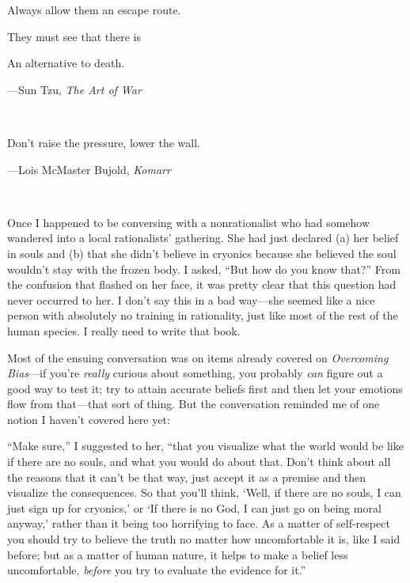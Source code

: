 {
 Always allow them an escape route.}

{
 They must see that there is}

{
 An alternative to death.}

{\raggedleft
 {}---Sun Tzu, \textit{The Art of War}
\par}


\bigskip

{
 ~}

{
 Don't raise the pressure, lower the wall.}

{\raggedleft
 {}---Lois McMaster Bujold, \textit{Komarr}
\par}


\bigskip

{
 ~}

{
 Once I happened to be conversing with a nonrationalist who had
somehow wandered into a local rationalists' gathering.
She had just declared (a) her belief in souls and (b) that she
didn't believe in cryonics because she believed the
soul wouldn't stay with the frozen body. I asked,
``But how do you know that?'' From
the confusion that flashed on her face, it was pretty clear that this
question had never occurred to her. I don't say this in
a bad way---she seemed like a nice person with absolutely no training
in rationality, just like most of the rest of the human species. I
really need to write that book.}

{
 Most of the ensuing conversation was on items already covered on
\textit{Overcoming Bias}{}---if you're \textit{really}
curious about something, you probably \textit{can} figure out a good
way to test it; try to attain accurate beliefs first and then let your
emotions flow from that---that sort of thing. But the conversation
reminded me of one notion I haven't covered here yet:}

{
 ``Make sure,'' I suggested to
her, ``that you visualize what the world would be like
if there are no souls, and what you would do about that.
Don't think about all the reasons that it
can't be that way, just accept it as a premise and then
visualize the consequences. So that you'll think,
`Well, if there are no souls, I can just sign up for
cryonics,' or `If there is no God, I can
just go on being moral anyway,' rather than it being
too horrifying to face. As a matter of self-respect you should try to
believe the truth no matter how uncomfortable it is, like I said
before; but as a matter of human nature, it helps to make a belief less
uncomfortable, \textit{before} you try to evaluate the evidence for
it.''}

